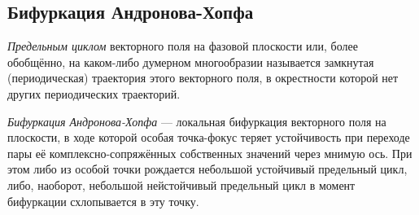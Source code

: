 \documentclass[a4paper]{article}
\begin{document}
\subsection{Бифуркация Андронова-Хопфа}
\begin{dfn}
	\emph{Предельным циклом} векторного поля на фазовой плоскости или,
	более обобщённо, на каком-либо думерном многообразии называется
	замкнутая (периодическая) траектория этого векторного поля, в
	окрестности которой нет других периодических траекторий.
\end{dfn}
\begin{dfn}
	\emph{Бифуркация Андронова-Хопфа} --- локальная бифуркация векторного
	поля на плоскости, в ходе которой особая точка-фокус теряет
	устойчивость при переходе пары её комплексно-сопряжённых собственных
	значений через мнимую ось. При этом либо из особой точки рождается
	небольшой устойчивый предельный цикл, либо, наоборот, небольшой
	нейстойчивый предельный цикл в момент бифуркации схлопывается в эту
	точку.
\end{dfn}
\end{document}

